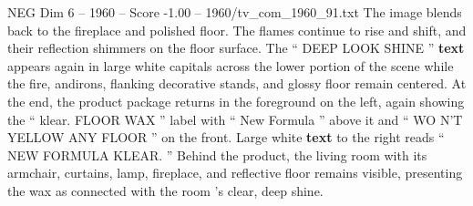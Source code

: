 \begin{textsample}{NEG Dim 6 – 1960 – Score -1.00 – 1960/tv\_com\_1960\_91.txt}
The image blends back to the fireplace and polished floor.
The flames continue to rise and shift, and their reflection shimmers on the floor surface.
The “ DEEP LOOK SHINE ” \textbf{text} appears again in large white capitals across the lower portion of the scene while the fire, andirons, flanking decorative stands, and glossy floor remain centered.
At the end, the product package returns in the foreground on the left, again showing the “ klear.
FLOOR WAX ” label with “ New Formula ” above it and “ WO N’T YELLOW ANY FLOOR ” on the front.
Large white \textbf{text} to the right reads “ NEW FORMULA KLEAR. ” Behind the product, the living room with its armchair, curtains, lamp, fireplace, and reflective floor remains visible, presenting the wax as connected with the room ’s clear, deep shine.

\end{textsample}
